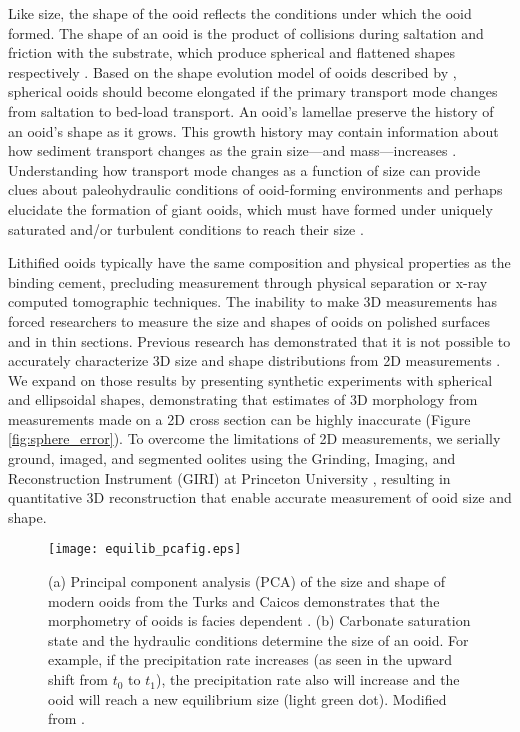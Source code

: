 \documentclass[draft]{agujournal2019}
\begin{document}
Like size,  the shape of the ooid reflects the conditions under which the ooid formed. The shape of an ooid is the product of collisions during saltation and friction with the substrate, which produce spherical and flattened shapes respectively \cite{domokos2012evolution,sipos2018shape}. Based on the shape evolution model of ooids described by , spherical ooids should become elongated if the primary transport mode changes from saltation to bed-load transport. An ooid's lamellae preserve the history of an ooid's shape as it grows. This growth history may contain information about how sediment transport changes as the grain size---and mass---increases \cite{heller1980transport}. Understanding how transport mode changes as a function of size can provide clues about paleohydraulic conditions of ooid-forming environments and perhaps elucidate the formation of giant ooids, which must have formed under uniquely saturated and/or turbulent conditions to reach their size \cite{heller1980transport,sumner1993numerical,sipos2018shape, trower2020enigma}.

Lithified ooids typically have the same composition and physical properties as the binding cement, precluding measurement through physical separation or x-ray computed tomographic techniques. The inability to make 3D measurements has forced researchers to measure the size and shapes of ooids on polished surfaces and in thin sections. Previous research has demonstrated that it is not possible to accurately characterize 3D size and shape distributions from 2D measurements \cite{dehoff1983quantitative,mehra2018multiscale}. We expand on those results by presenting synthetic experiments with spherical and ellipsoidal shapes, demonstrating that estimates of 3D morphology from measurements made on a 2D cross section can be highly inaccurate (Figure \ref{fig:sphere_error}). To overcome the limitations of 2D measurements, we serially ground, imaged, and segmented oolites using the Grinding, Imaging, and Reconstruction Instrument (GIRI) at Princeton University \cite{mehra2018multiscale}, resulting in quantitative 3D reconstruction that enable accurate measurement of ooid size and shape. 

\begin{figure}[h]
    \centering
    \texttt{[image: equilib\_pcafig.eps]}
    \caption{
    (a) Principal component analysis (PCA) of the size and shape of modern ooids from the Turks and Caicos demonstrates that the morphometry of ooids is facies dependent . (b) Carbonate saturation state and the hydraulic conditions determine the size of an ooid. For example, if the precipitation rate increases (as seen in the upward shift from \(t_0\) to \(t_1\)), the precipitation rate also will increase and the ooid will reach a new equilibrium size (light green dot). Modified from .} 
    \label{fig:equil_size}
\end{figure}
\end{document}
